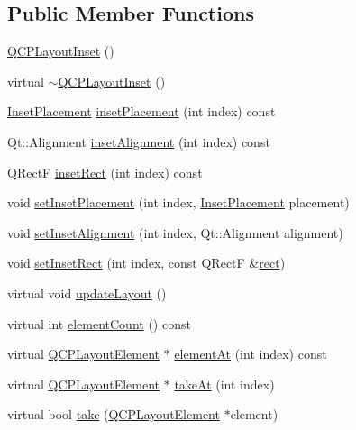 \subsection*{Public Member Functions}
\begin{DoxyCompactItemize}
\item 
\hyperlink{classQCPLayoutInset_a3ad984f3221735374cc5dee14356a7dd}{Q\+C\+P\+Layout\+Inset} ()
\item 
virtual \hyperlink{classQCPLayoutInset_a7d0e5647b2e92df92abab532441db112}{$\sim$\+Q\+C\+P\+Layout\+Inset} ()
\item 
\hyperlink{classQCPLayoutInset_a8b9e17d9a2768293d2a7d72f5e298192}{Inset\+Placement} \hyperlink{classQCPLayoutInset_a8472ff2508807513e4cb0ce0c1d652b3}{inset\+Placement} (int index) const 
\item 
Qt\+::\+Alignment \hyperlink{classQCPLayoutInset_a78c0c494bb5728237cebb63ae8ef5c58}{inset\+Alignment} (int index) const 
\item 
Q\+RectF \hyperlink{classQCPLayoutInset_a5ec7037b3b8d20fbf9560e01779b1442}{inset\+Rect} (int index) const 
\item 
void \hyperlink{classQCPLayoutInset_a63298830744d5d8c5345511c00fd2144}{set\+Inset\+Placement} (int index, \hyperlink{classQCPLayoutInset_a8b9e17d9a2768293d2a7d72f5e298192}{Inset\+Placement} placement)
\item 
void \hyperlink{classQCPLayoutInset_a62882a4f9ad58bb0f53da12fde022abe}{set\+Inset\+Alignment} (int index, Qt\+::\+Alignment alignment)
\item 
void \hyperlink{classQCPLayoutInset_aa487c8378a6f9533567a2e6430099dc3}{set\+Inset\+Rect} (int index, const Q\+RectF \&\hyperlink{classQCPLayoutElement_affdfea003469aac3d0fac5f4e06171bc}{rect})
\item 
virtual void \hyperlink{classQCPLayoutInset_a7b33fdd51b18e6db7cea9bfb2d263b4a}{update\+Layout} ()
\item 
virtual int \hyperlink{classQCPLayoutInset_a2087b97b9266fd9e0f571a8d3cf709f9}{element\+Count} () const 
\item 
virtual \hyperlink{classQCPLayoutElement}{Q\+C\+P\+Layout\+Element} $\ast$ \hyperlink{classQCPLayoutInset_ab096d07b08f9b5455647f3ba7ff60e27}{element\+At} (int index) const 
\item 
virtual \hyperlink{classQCPLayoutElement}{Q\+C\+P\+Layout\+Element} $\ast$ \hyperlink{classQCPLayoutInset_ad6756a3b507e20496aaf7f5ca16c47d1}{take\+At} (int index)
\item 
virtual bool \hyperlink{classQCPLayoutInset_a9ac707ccff650633b97f52dd5cddcf49}{take} (\hyperlink{classQCPLayoutElement}{Q\+C\+P\+Layout\+Element} $\ast$element)

\end{DoxyCompactItemize}
